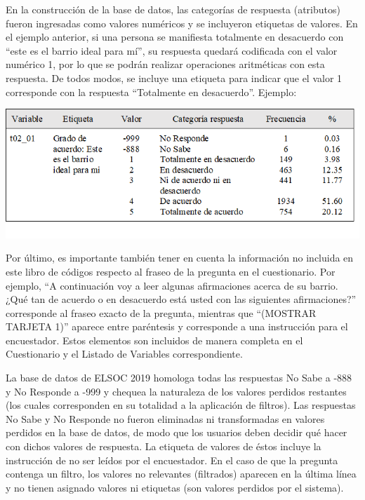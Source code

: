 \documentclass[
]{book}
\begin{document}
En la construcción de la base de datos, las categorías de respuesta (atributos) fueron ingresadas como valores numéricos y se incluyeron etiquetas de valores. En el ejemplo anterior, si una persona se manifiesta totalmente en desacuerdo con ``este es el barrio ideal para mí'', su respuesta quedará codificada con el valor numérico 1, por lo que se podrán realizar operaciones aritméticas con esta respuesta. De todos modos, se incluye una etiqueta para indicar que el valor 1 corresponde con la respuesta ``Totalmente en desacuerdo''. Ejemplo:

\begin{center}\includegraphics[width=0.9\linewidth,height=0.9\textheight]{imagenes/t02_01} \end{center}

Por último, es importante también tener en cuenta la información no incluida en este libro de códigos respecto al fraseo de la pregunta en el cuestionario. Por ejemplo, ``A continuación voy a leer algunas afirmaciones acerca de su barrio. ¿Qué tan de acuerdo o en desacuerdo está usted con las siguientes afirmaciones?'' corresponde al fraseo exacto de la pregunta, mientras que ``(MOSTRAR TARJETA 1)'' aparece entre paréntesis y corresponde a una instrucción para el encuestador. Estos elementos son incluidos de manera completa en el Cuestionario y el Listado de Variables correspondiente.

La base de datos de ELSOC 2019 homologa todas las respuestas No Sabe a -888 y No Responde a -999 y chequea la naturaleza de los valores perdidos restantes (los cuales corresponden en su totalidad a la aplicación de filtros). Las respuestas No Sabe y No Responde no fueron eliminadas ni transformadas en valores perdidos en la base de datos, de modo que los usuarios deben decidir qué hacer con dichos valores de respuesta. La etiqueta de valores de éstos incluye la instrucción de no ser leídos por el encuestador. En el caso de que la pregunta contenga un filtro, los valores no relevantes (filtrados) aparecen en la última línea y no tienen asignado valores ni etiquetas (son valores perdidos por el sistema).
\end{document}
